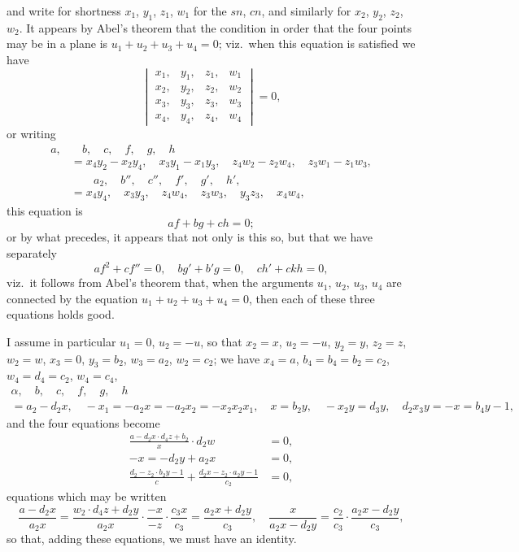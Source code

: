 \documentclass[12pt,a4paper]{article}
\theoremstyle{definition}
\begin{document}
\noindent and write for shortness $x_1$, $y_1$, $z_1$, $w_1$ for the $sn$, $cn$, and similarly for $x_2$, $y_2$, $z_2$, $w_2$. It appears by Abel's theorem that the condition in order that the four points may be in a plane is $u_1 + u_2 + u_3 + u_4 = 0$; viz.\ when this equation is satisfied we have
\[
\begin{vmatrix}
x_1, & y_1, & z_1, & w_1 \\
x_2, & y_2, & z_2, & w_2 \\
x_3, & y_3, & z_3, & w_3 \\
x_4, & y_4, & z_4, & w_4
\end{vmatrix} = 0,
\]
or writing
\begin{align*}
a, & \quad b, \quad c, \quad f, \quad g, \quad h \\
&= x_4 y_2 - x_2 y_4, \quad x_3 y_1 - x_1 y_3, \quad z_4 w_2 - z_2 w_4, \quad z_3 w_1 - z_1 w_3, \\
& \qquad a_2, \quad b'', \quad c'', \quad f', \quad g', \quad h', \\
&= x_4 y_4, \quad x_3 y_3, \quad z_4 w_4, \quad z_3 w_3, \quad y_3 z_3, \quad x_4 w_4,
\end{align*}
this equation is
\[
af + bg + ch = 0;
\]
or by what precedes, it appears that not only is this so, but that we have separately
\[
af^2 + cf'' = 0, \quad bg' + b'g = 0, \quad ch' + ck h = 0,
\]
viz.\ it follows from Abel's theorem that, when the arguments $u_1$, $u_2$, $u_3$, $u_4$ are connected by the equation $u_1 + u_2 + u_3 + u_4 = 0$, then each of these three equations holds good.

I assume in particular $u_1 = 0$, $u_2 = -u$, so that $x_2 = x$, $u_2 = -u$, $y_2 = y$, $z_2 = z$, $w_2 = w$, $x_3 = 0$, $y_3 = b_2$, $w_3 = a_2$, $w_2 = c_2$; we have $x_4 = a$, $b_4 = b_4 = b_2 = c_2$, $w_4 = d_4 = c_2$, $w_4 = c_4$,
\begin{align*}
\alpha, \quad b, \quad c, \quad f, \quad g, \quad h \\
= a_2 - d_2x, \quad -x_1 = -a_2x = -a_2x_2 = -x_2x_2x_1, \quad x = b_2y, \quad -x_2y = d_3y, \quad d_2x_3y = -x = b_4y - 1,
\end{align*}
and the four equations become
\begin{align*}
\frac{a - d_2x \cdot d_4z + b_2}{x} \cdot d_2w &= 0, \\
-x = -d_2y + a_2x &= 0, \\
\frac{d_2 - z_2 \cdot b_2y - 1}{c} + \frac{d_2x - z_2 \cdot a_2y - 1}{c_2} &= 0,
\end{align*}
equations which may be written
\[
\frac{a - d_2x}{a_2x} = \frac{w_2 \cdot d_4z + d_2y}{a_2x} \cdot \frac{-x}{-z} \cdot \frac{c_3x}{c_3} = \frac{a_2x + d_2y}{c_3}, \quad \frac{x}{a_2x - d_2y} = \frac{c_2}{c_3} \cdot \frac{a_2x - d_2y}{c_3},
\]
so that, adding these equations, we must have an identity.
\end{document}
